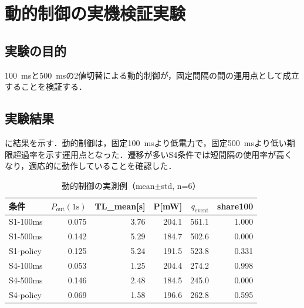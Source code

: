 \section{動的制御の実機検証実験}
\label{sec:exp_dynamic_control}

\subsection{実験の目的}

\SI{100}{\milli\second}と\SI{500}{\milli\second}の2値切替による動的制御が，固定間隔の間の運用点として成立することを検証する．

\subsection{実験結果}

に結果を示す．動的制御は，固定\SI{100}{\milli\second}より低電力で，固定\SI{500}{\milli\second}より低い期限超過率を示す運用点となった．遷移が多いS4条件では短間隔の使用率が高くなり，適応的に動作していることを確認した．

\begin{table}[tb]
  \centering
  \caption{動的制御の実測例（mean$\pm$std, n=6）}
  \begin{tabular}{lrrrrr}
    \toprule
    条件 & $P_{\mathrm{out}}(1\mathrm{s})$ & TL\_mean[s] & P[mW] & $q_{\mathrm{event}}$ & share100 \\
    \midrule
    S1-100ms & 0.075 & 3.76 & 204.1 & 561.1 & 1.000 \\
    S1-500ms & 0.142 & 5.29 & 184.7 & 502.6 & 0.000 \\
    S1-policy & 0.125 & 5.24 & 191.5 & 523.8 & 0.331 \\
    S4-100ms & 0.053 & 1.25 & 204.4 & 274.2 & 0.998 \\
    S4-500ms & 0.146 & 2.48 & 184.5 & 245.0 & 0.000 \\
    S4-policy & 0.069 & 1.58 & 196.6 & 262.8 & 0.595 \\
    \bottomrule
  \end{tabular}
\end{table}

\clearpage

